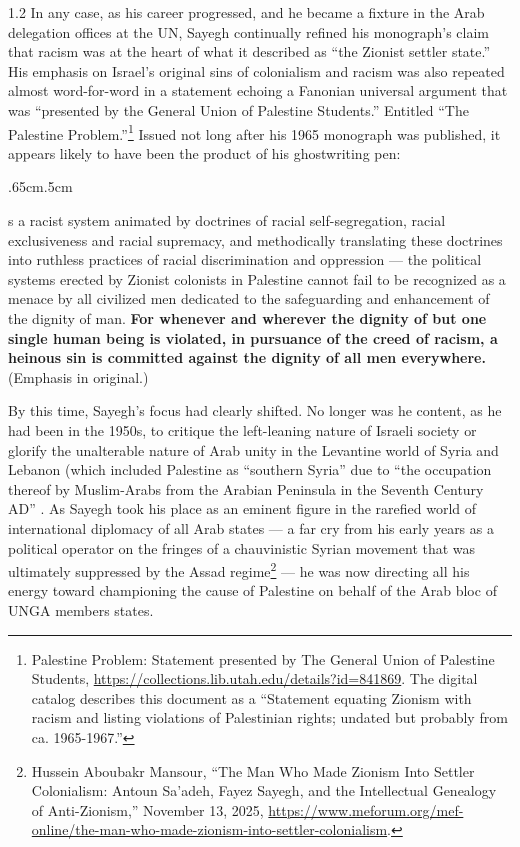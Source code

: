 \documentclass[../unravbook.tex]{subfiles}
\begin{document}
\begin{spacing}{1.2}
In any case, as his career progressed, and he became a fixture in the Arab delegation offices at the UN, Sayegh continually refined his monograph's claim that racism was at the heart of what it described as \enquote{the Zionist settler state.} His emphasis on Israel's original sins of colonialism and racism was also repeated almost word-for-word in a statement echoing a Fanonian universal argument that was ``presented by the General Union of Palestine Students.'' Entitled ``The Palestine Problem.''\footnote{Palestine Problem: Statement presented by The General Union of Palestine Students, \url{https://collections.lib.utah.edu/details?id=841869}. The digital catalog describes this document as a ``Statement equating Zionism with racism and listing violations of Palestinian rights; undated but probably from ca. 1965-1967.''} Issued not long after his 1965 monograph was published, it appears likely to have been the product of his ghostwriting pen:

\begin{adjustwidth}{.65cm}{.5cm}
  \begin{singlespace} 
    [A]s a racist system animated by doctrines of racial self-segregation, racial exclusiveness and racial supremacy, and methodically translating these doctrines into ruthless practices of racial discrimination and oppression — the political systems erected by Zionist colonists in Palestine cannot fail to be recognized as a menace by all civilized men dedicated to the safeguarding and enhancement of the dignity of man. \textbf{For whenever and wherever the dignity of but one single human being is violated, in pursuance of the creed of racism, a heinous sin is committed against the dignity of all men everywhere.} (Emphasis in original.)
  \end{singlespace}
\end{adjustwidth}

By this time, Sayegh's focus had clearly shifted. No longer was he content, as he had been in the 1950s, to critique the left-leaning nature of Israeli society \parencite{Sayegh-1958b} or glorify the unalterable nature of Arab unity in the Levantine world of Syria and Lebanon (which included Palestine as \enquote{southern Syria} due to \enquote{the occupation thereof by Muslim-Arabs from the Arabian Peninsula in the Seventh Century AD} \parencite[12]{Sayegh-1958a}. As Sayegh took his place as an eminent figure in the rarefied world of international diplomacy of all Arab states --- a far cry from his early years as a political operator on the fringes of a chauvinistic Syrian movement that was ultimately suppressed by the Assad regime\footnote{Hussein Aboubakr Mansour, ``The Man Who Made Zionism Into Settler Colonialism: Antoun Sa'adeh, Fayez Sayegh, and the Intellectual Genealogy of Anti-Zionism,'' November 13, 2025, \url{https://www.meforum.org/mef-online/the-man-who-made-zionism-into-settler-colonialism}.} --- he was now directing all his energy toward championing the cause of Palestine on behalf of the Arab bloc of UNGA members states.


\end{spacing}
\end{document}
